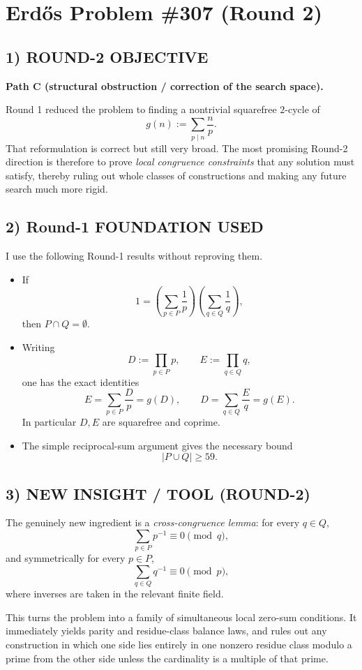 \section{Erd\H{o}s Problem \#307 (Round 2)}

\subsection*{1) ROUND-2 OBJECTIVE}
\textbf{Path C (structural obstruction / correction of the search space).}

Round 1 reduced the problem to finding a nontrivial squarefree $2$-cycle of
\[
g(n):=\sum_{p\mid n}\frac{n}{p}.
\]
That reformulation is correct but still very broad. The most promising Round-2 direction is therefore to prove \emph{local congruence constraints} that any solution must satisfy, thereby ruling out whole classes of constructions and making any future search much more rigid.

\subsection*{2) Round-1 FOUNDATION USED}
I use the following Round-1 results without reproving them.

\begin{itemize}
\item If
\[
1=\left(\sum_{p\in P}\frac1p\right)\left(\sum_{q\in Q}\frac1q\right),
\]
then $P\cap Q=\emptyset$.
\item Writing
\[
D:=\prod_{p\in P}p,\qquad E:=\prod_{q\in Q}q,
\]
one has the exact identities
\[
E=\sum_{p\in P}\frac{D}{p}=g(D),\qquad D=\sum_{q\in Q}\frac{E}{q}=g(E).
\]
In particular $D,E$ are squarefree and coprime.
\item The simple reciprocal-sum argument gives the necessary bound
\[
|P\cup Q|\ge 59.
\]
\end{itemize}

\subsection*{3) NEW INSIGHT / TOOL (ROUND-2)}
The genuinely new ingredient is a \emph{cross-congruence lemma}:
for every $q\in Q$,
\[
\sum_{p\in P} p^{-1}\equiv 0 \pmod q,
\]
and symmetrically for every $p\in P$,
\[
\sum_{q\in Q} q^{-1}\equiv 0 \pmod p,
\]
where inverses are taken in the relevant finite field.

This turns the problem into a family of simultaneous local zero-sum conditions. It immediately yields parity and residue-class balance laws, and rules out any construction in which one side lies entirely in one nonzero residue class modulo a prime from the other side unless the cardinality is a multiple of that prime.

